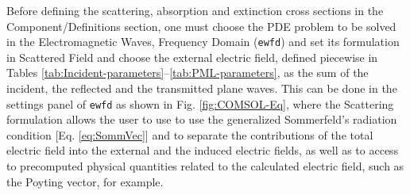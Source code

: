 Before defining the scattering, absorption and extinction cross sections in the Component/Definitions section, one must choose the PDE problem to be solved in the Electromagnetic Waves, Frequency Domain (\lstinline!ewfd!) and set its formulation in Scattered Field and choose the external electric field, defined piecewise in Tables \ref{tab:Incident-parameters}--\ref{tab:PML-parameters}, as the sum of the incident, the reflected and the transmitted plane waves. This can be done in the settings panel of \lstinline!ewfd! as shown in Fig. \ref{fig:COMSOL-Eq}, where the Scattering formulation allows the user to use to use the generalized Sommerfeld's  radiation condition [Eq. \eqref{eq:SommVec}] and to separate the contributions of the total electric field into the external and the induced electric fields, as well as to access to precomputed physical quantities related to the calculated electric field, such as the Poyting vector, for example.

